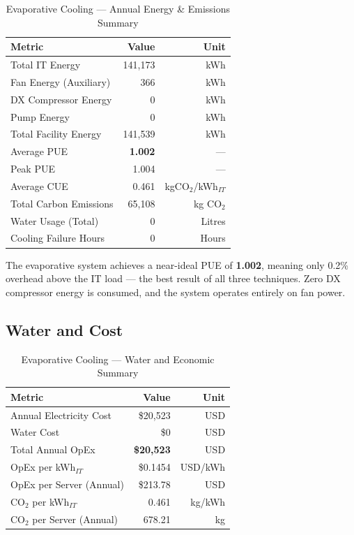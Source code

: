 \documentclass[12pt,a4paper]{report}
\begin{document}
\begin{table}[H]
\centering
\caption{Evaporative Cooling --- Annual Energy \& Emissions Summary}
\label{tab:evap_annual}
\renewcommand{\arraystretch}{1.3}
\begin{tabular}{lrr}
\toprule
\textbf{Metric} & \textbf{Value} & \textbf{Unit} \\
\midrule
Total IT Energy & 141{,}173 & kWh \\
Fan Energy (Auxiliary) & 366 & kWh \\
DX Compressor Energy & 0 & kWh \\
Pump Energy & 0 & kWh \\
Total Facility Energy & 141{,}539 & kWh \\
Average PUE & \textbf{1.002} & --- \\
Peak PUE & 1.004 & --- \\
Average CUE & 0.461 & kgCO$_2$/kWh$_{IT}$ \\
Total Carbon Emissions & 65{,}108 & kg CO$_2$ \\
Water Usage (Total) & 0 & Litres \\
Cooling Failure Hours & 0 & Hours \\
\bottomrule
\end{tabular}
\end{table}

\noindent The evaporative system achieves a near-ideal PUE of \textbf{1.002}, meaning only 0.2\%
overhead above the IT load --- the best result of all three techniques. Zero DX compressor energy
is consumed, and the system operates entirely on fan power.

\subsection{Water and Cost}

\begin{table}[H]
\centering
\caption{Evaporative Cooling --- Water and Economic Summary}
\label{tab:evap_water_econ}
\renewcommand{\arraystretch}{1.3}
\begin{tabular}{lrr}
\toprule
\textbf{Metric} & \textbf{Value} & \textbf{Unit} \\
\midrule
Annual Electricity Cost & \$20{,}523 & USD \\
Water Cost & \$0 & USD \\
Total Annual OpEx & \textbf{\$20{,}523} & USD \\
OpEx per kWh$_{IT}$ & \$0.1454 & USD/kWh \\
OpEx per Server (Annual) & \$213.78 & USD \\
CO$_2$ per kWh$_{IT}$ & 0.461 & kg/kWh \\
CO$_2$ per Server (Annual) & 678.21 & kg \\
\bottomrule
\end{tabular}
\end{table}
\end{document}
